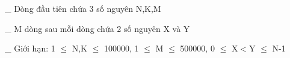 \_ Dòng đầu tiên chứa 3 số nguyên N,K,M  

   \_ M dòng sau mỗi dòng chứa 2 số nguyên X và Y  

   \_ Giới hạn: 1 $\le$ N,K $\le$ 100000, 1 $\le$ M $\le$ 500000, 0 $\le$ X$<$Y $\le$ N-1
